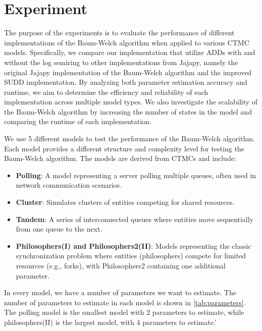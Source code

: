 \section{Experiment}\label{sec:experiment}

The purpose of the experiments is to evaluate the performance of different implementations of the Baum-Welch algorithm when applied to various CTMC models. Specifically, we compare our implementation that utilize ADDs with and without the log semiring to other implementations from Jajapy, namely the original Jajapy implementation of the Baum-Welch algorithm and the improved SUDD implementation. By analyzing both parameter estimation accuracy and runtime, we aim to determine the efficiency and reliability of each implementation across multiple model types.
We also investigate the scalability of the Baum-Welch algorithm by increasing the number of states in the model and comparing the runtime of each implementation.

We use 5 different models to test the performance of the Baum-Welch algorithm.
Each model provides a different structure and complexity level for testing the Baum-Welch algorithm. The models are derived from CTMCs and include:
\begin{itemize}
    \item \textbf{Polling}: A model representing a server polling multiple queues, often used in network communication scenarios.
    \item \textbf{Cluster}: Simulates clusters of entities competing for shared resources.
    \item \textbf{Tandem}: A series of interconnected queues where entities move sequentially from one queue to the next.
    \item \textbf{Philosophers(I) and Philosophers2(II)}: Models representing the classic synchronization problem where entities (philosophers) compete for limited resources (e.g., forks), with Philosophers2 containing one additional parameter.
\end{itemize}

In every model, we have a number of parameters we want to estimate. 
The number of parameters to estimate in each model is shown in \autoref{tab:parameters}.
The polling model is the smallest model with 2 parameters to estimate, while philosophers(II) is the largest model, with 4 parameters to estimate.'

